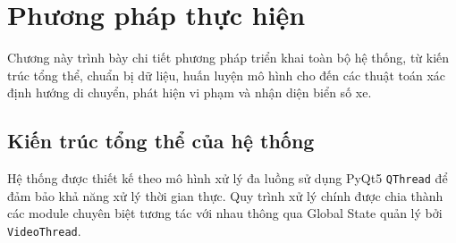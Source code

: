 ﻿\chapter{Phương pháp thực hiện}
\label{ch:phuong_phap}

Chương này trình bày chi tiết phương pháp triển khai toàn bộ hệ thống, từ kiến trúc tổng thể, chuẩn bị dữ liệu, huấn luyện mô hình cho đến các thuật toán xác định hướng di chuyển, phát hiện vi phạm và nhận diện biển số xe.

\section{Kiến trúc tổng thể của hệ thống}

Hệ thống được thiết kế theo mô hình xử lý đa luồng sử dụng PyQt5 \texttt{QThread} để đảm bảo khả năng xử lý thời gian thực. Quy trình xử lý chính được chia thành các module chuyên biệt tương tác với nhau thông qua Global State quản lý bởi \texttt{VideoThread}.

